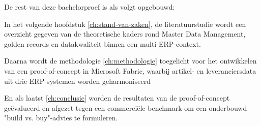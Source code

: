 
De rest van deze bachelorproef is als volgt opgebouwd:

In het volgende hoofdstuk \ref{ch:stand-van-zaken}, de literatuurstudie wordt een overzicht gegeven van de theoretische kaders rond Master Data Management, golden records en datakwaliteit binnen een multi-ERP-context.

Daarna wordt de methodologie  \ref{ch:methodologie}  toegelicht voor het ontwikkelen van een proof-of-concept in Microsoft Fabric, waarbij artikel- en leveranciersdata uit drie ERP-systemen worden geharmoniseerd

En als laatst \ref{ch:conclusie} worden de resultaten van de proof-of-concept geëvalueerd en afgezet tegen een commerciële benchmark om een onderbouwd "build vs. buy"-advies te formuleren. 
